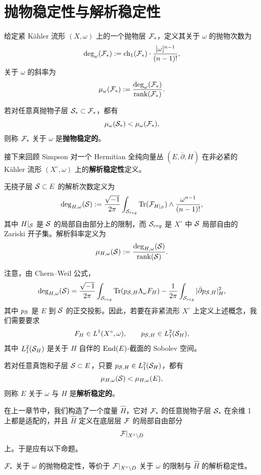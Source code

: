 \chapter{抛物稳定性与解析稳定性}

给定紧 Kähler 流形 \((X,\omega)\) 上的一个抛物层 \(\mathcal{F}_*\)，定义其关于 \(\omega\) 的抛物次数为
\[
\deg_\omega(\mathcal{F}_*):=\operatorname{ch}_1(\mathcal{F}_*)\cdot \frac{[\omega]^{n-1}}{(n-1)!},
\]
关于 \(\omega\) 的斜率为
\[
\mu_\omega(\mathcal{F}_*):=\frac{\deg_\omega(\mathcal{F}_*)}{\operatorname{rank}(\mathcal{F}_*)}.
\]

\begin{definition}[抛物稳定性]
若对任意真抛物子层 \(\mathcal{S}_*\subset \mathcal{F}_*\)，都有
\[
\mu_\omega(\mathcal{S}_*)<\mu_\omega(\mathcal{F}_*),
\]
则称 \(\mathcal{F}_*\) 关于 \(\omega\) 是\textbf{抛物稳定的}。
\end{definition}

接下来回顾 Simpson \cite{Si1} 对一个 Hermitian 全纯向量丛 \((E,\bar\partial,H)\) 在非必紧的 Kähler 流形 \((X^\circ,\omega)\) 上的\textbf{解析稳定性}定义。

无挠子层 \(\mathcal{S}\subset E\) 的解析次数定义为
\[
\deg_{H,\omega}(\mathcal{S})
:=
\frac{\sqrt{-1}}{2\pi}
\int_{\mathcal{S}_{reg}}
\operatorname{Tr}(\mathcal{F}_{H|_{\mathcal{S}}})\wedge \frac{\omega^{n-1}}{(n-1)!},
\]
其中 \(H|_{\mathcal{S}}\) 是 \(\mathcal{S}\) 的局部自由部分上的限制，而 \(\mathcal{S}_{reg}\) 是 \(X^\circ\) 中 \(\mathcal{S}\) 局部自由的 Zariski 开子集。解析斜率定义为
\[
\mu_{H,\omega}(\mathcal{S}):=\frac{\deg_{H,\omega}(\mathcal{S})}{\operatorname{rank}(\mathcal{S})}.
\]

注意，由 Chern--Weil 公式，
\[
\deg_{H,\omega}(\mathcal{S})
=
\frac{\sqrt{-1}}{2\pi}
\int_{\mathcal{S}_{reg}}\operatorname{Tr}(p_{\mathcal{S},H}\Lambda_\omega F_H)
-
\frac{1}{2\pi}
\int_{\mathcal{S}_{reg}}|\bar\partial p_{\mathcal{S},H}|_H^2,
\]
其中 \(p_{\mathcal{S}}\) 是 \(E\) 到 \(\mathcal{S}\) 的正交投影。因此，若要在非紧流形 \(X^\circ\) 上定义上述概念，我们需要要求
\[
F_H\in L^1(X^\circ,\omega),\qquad
p_{\mathcal{S},H}\in L_1^2(\mathcal{S}_H),
\]
其中 \(L_1^2(\mathcal{S}_H)\) 是关于 \(H\) 自伴的 \(\operatorname{End}(E)\)-截面的 Sobolev 空间。

\begin{definition}[解析稳定性]
若对任意真饱和子层 \(\mathcal{S}\subset E\)，只要 \(p_{\mathcal{S},H}\in L_1^2(\mathcal{S}_H)\)，都有
\[
\mu_{H,\omega}(\mathcal{S})<\mu_{H,\omega}(E),
\]
则称 \(E\) 关于 \(\omega\) 与 \(H\) 是\textbf{解析稳定的}。
\end{definition}

在上一章节中，我们构造了一个度量 \(\widehat{H}\)，它对 \(\mathcal{F}_*\) 的任意抛物子层 \(\mathcal{S}_*\) 在余维 1 上都是适配的，并且 \(\widehat{H}\) 定义在底层层 \(\mathcal{F}\) 的局部自由部分
\[
\mathcal{F}|_{X^\circ\setminus D}
\]
上。于是应有以下命题。

\begin{proposition}
\(\mathcal{F}_*\) 关于 \(\omega\) 的抛物稳定性，等价于 \(\mathcal{F}|_{X^\circ\setminus D}\) 关于 \(\omega\) 的限制与 \(\widehat{H}\) 的解析稳定性。
\end{proposition}

